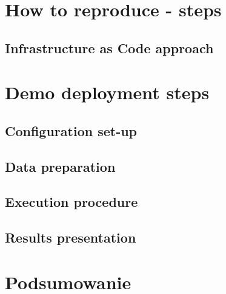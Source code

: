 \documentclass[onecolumn,12pt]{article}
\begin{document}
\section{How to reproduce - steps}

\subsection{Infrastructure as Code approach}

\section{Demo deployment steps}

\subsection{Configuration set-up}
\subsection{Data preparation}
\subsection{Execution procedure}
\subsection{Results presentation}

\section{Podsumowanie}

%
\end{document}
